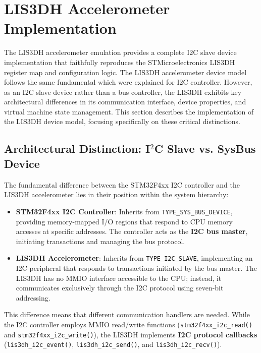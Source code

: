 \section{LIS3DH Accelerometer Implementation}
\label{sec:impl_lis3dh}

The LIS3DH accelerometer emulation provides a complete I2C slave device implementation 
that faithfully reproduces the STMicroelectronics LIS3DH register map 
and configuration logic. The LIS3DH accelerometer device model follows the same fundamental
which were explained for I2C controller. However, as an I2C slave device rather than a bus controller, the LIS3DH exhibits key architectural
differences in its communication interface, device properties, and virtual machine state
management. This section describes the implementation of the LIS3DH device model,
focusing specifically on these critical distinctions.

\subsection{\texorpdfstring{Architectural Distinction: I$^2$C Slave vs. SysBus Device}
                         {Architectural Distinction: I2C Slave vs. SysBus Device}}

\label{subsec:slave_vs_sysbus}

The fundamental difference between the STM32F4xx I2C controller and the LIS3DH 
accelerometer lies in their position within the system hierarchy:

\begin{itemize}
    \item \textbf{STM32F4xx I2C Controller}: Inherits from \texttt{TYPE\_SYS\_BUS\_DEVICE}, 
    providing memory-mapped I/O regions that respond to CPU memory accesses at specific 
    addresses. The controller acts as the \textbf{I2C bus master}, initiating transactions and managing the bus protocol.
    
    \item \textbf{LIS3DH Accelerometer}: Inherits from \texttt{TYPE\_I2C\_SLAVE}, 
    implementing an I2C peripheral that responds to transactions initiated by the bus 
    master. The LIS3DH has no MMIO interface accessible to the CPU; instead, it 
    communicates exclusively through the I2C protocol using seven-bit addressing.
\end{itemize}

This difference means that different communication handlers are needed. While 
the I2C controller employs MMIO read/write functions (\texttt{stm32f4xx\_i2c\_read()} 
and \texttt{stm32f4xx\_i2c\_write()}), the LIS3DH implements \textbf{I2C protocol callbacks} (\texttt{lis3dh\_i2c\_event()}, \texttt{lis3dh\_i2c\_send()}, and
\texttt{lis3dh\_i2c\_recv()}).


